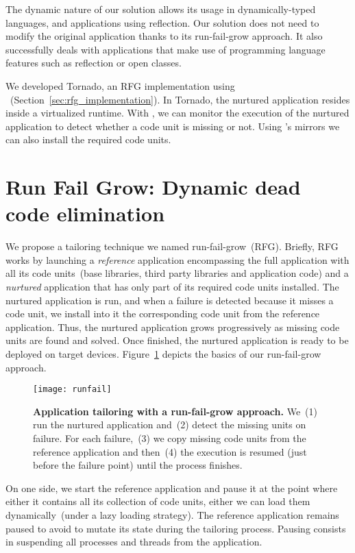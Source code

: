 The dynamic nature of our solution allows its usage in dynamically-typed languages, and applications using reflection. Our solution does not need to modify the original application thanks to its run-fail-grow approach.
It also successfully deals with applications that make use of programming language features such as reflection or open classes.

We developed Tornado, an RFG implementation using \Vtt~(Section~\ref{sec:rfg_implementation}). In Tornado, the nurtured application resides inside a virtualized runtime. With \Vtt, we can monitor the execution of the nurtured application to detect whether a code unit is missing or not. Using \Vtt's mirrors we can also install the required code units.

\section{Run Fail Grow: Dynamic dead code elimination}\label{sec:rfg_model}

We propose a tailoring technique we named run-fail-grow~(RFG). Briefly, RFG works by launching a \emph{reference} application encompassing the full application with all its code units~(base libraries, third party libraries and application code) and a \emph{nurtured} application that has only part of its required code units installed. The nurtured application is run, and when a failure is detected because it misses a code unit, we install into it the corresponding code unit from the reference application. Thus, the nurtured application grows progressively as missing code units are found and solved.
Once finished, the nurtured application is ready to be deployed on target devices. Figure~\ref{fig:runfail} depicts the basics of our run-fail-grow approach.

\begin{figure}[ht]
\begin{center}
\texttt{[image: runfail]}
\caption{\small \textbf{Application tailoring with a run-fail-grow approach.} We~(1) run the nurtured application and~(2) detect the missing units on failure. For each failure,~(3) we copy missing code units from the reference application and then~(4) the execution is resumed (just before the failure point) until the process finishes. \label{fig:runfail}}
\end{center}
\end{figure}

On one side, we start the reference application and pause it at the point where either it contains all its collection of code units, either we can load them dynamically~(under a lazy loading strategy). The reference application remains paused to avoid to mutate its state during the tailoring process. Pausing consists in suspending all processes and threads from the application.

